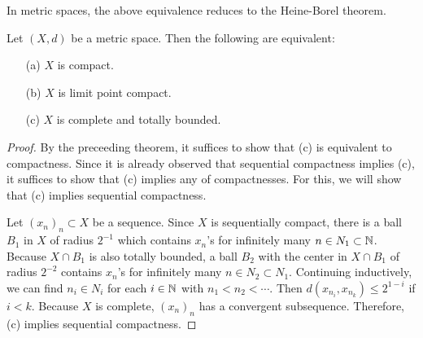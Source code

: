 In metric spaces, the above equivalence reduces to the Heine-Borel theorem.
\begin{thm}
    Let $(X, d)$ be a metric space.
    Then the following are equivalent:
    \begin{enumerate}
        \item[(a)]
        {
            $X$ is compact.
        }
        \item[(b)]
        {
            $X$ is limit point compact.
        }
        \item[(c)]
        {
            $X$ is complete and totally bounded.
        }
    \end{enumerate}
\end{thm}
\begin{proof}
    By the preceeding theorem, it suffices to show that (c) is equivalent to compactness.
    Since it is already observed that sequential compactness implies (c), it suffices to show that (c) implies any of compactnesses.
    For this, we will show that (c) implies sequential compactness.

    Let $(x_n)_n\subset X$ be a sequence.
    Since $X$ is sequentially compact, there is a ball $B_1$ in $X$ of radius $2^{-1}$ which contains $x_n$'s for infinitely many $n\in N_1\subset{\mathbb{N}}$.
    Because $X\cap B_1$ is also totally bounded, a ball $B_2$ with the center in $X\cap B_1$ of radius $2^{-2}$ contains $x_n$'s for infinitely many $n\in N_2\subset N_1$.
    Continuing inductively, we can find $n_i\in N_i$ for each $i\in{\mathbb{N}}$ with $n_1<n_2<\cdots$.
    Then $d(x_{n_i}, x_{n_k})\leq 2^{1-i}$ if $i<k$.
    Because $X$ is complete, $(x_n)_n$ has a convergent subsequence.
    Therefore, (c) implies sequential compactness.
\end{proof}

